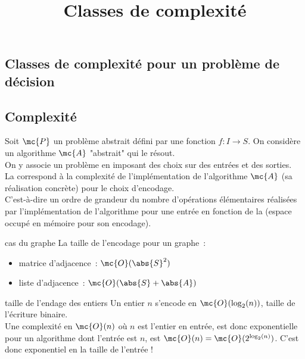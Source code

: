 

\begin{adjustwidth}{-3cm}{-3cm}

\setcounter{chapitre}{11}
\title{Classes de complexité}
\maketitle
\section{Classes de complexité pour un problème de décision}
\subsection{Complexité}

\newcommand{\pbm}{\mc{P}}
\newcommand{\algo}{\mc{A}}
\newcommand{\reductibleP}{\leq_m^\mr{P}}


\begin{definition}{}{}
    Soit $\mc{P}$ un problème abstrait défini par une fonction $f:I\to S$. On considère un algorithme $\mc{A}$ "abstrait" qui le résout.\\
    On y associe un problème  en imposant des choix sur  des entrées et des sorties.\\
    La  correspond à la complexité de l'implémentation de l'algorithme $\algo$ (sa réalisation concrète) pour le choix d'encodage.\\
    C'est-à-dire un ordre de grandeur du nombre d'opérations élémentaires réalisées par l'implémentation de l'algorithme pour une entrée en fonction de la  (espace occupé en mémoire pour son encodage).
\end{definition}

\begin{remarque}{}{cas du graphe}
    La taille de l'encodage pour un graphe~:
    \begin{itemize}
        \item matrice d'adjacence~: $\mc{O}(\abs{S}^2)$
        \item liste d'adjacence~: $\mc{O}(\abs{S} + \abs{A})$
    \end{itemize}
\end{remarque}

\begin{exemple}{}{taille de l'endage des entiers}
    Un entier $n$ s'encode en $\mc{O}(\log_2(n))$, taille de l'écriture binaire.\\
    Une complexité en $\mc{O}(n)$ où $n$ est l'entier en entrée, est donc exponentielle pour un algorithme dont l'entrée est $n$, est $\mc{O}(n) = \mc{O}(2^{\log_2(n)})$. C'est donc exponentiel en la taille de l'entrée !
\end{exemple}


\end{adjustwidth}
